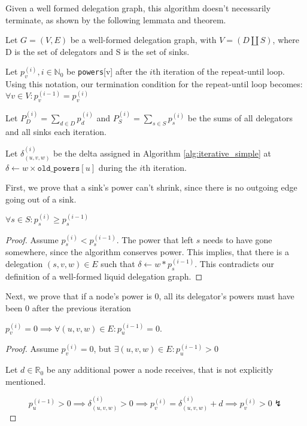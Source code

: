 
Given a well formed delegation graph, this algorithm doesn't necessarily terminate, as shown by the following lemmata and theorem.

Let $G = (V, E)$ be a well-formed delegation graph, with $V = (D \coprod S)$, where D is the set of delegators and S is the set of sinks.

Let $p_v^{(i)}, i \in \mathbb{N}_0$ be \texttt{powers}[v] after the $i$th iteration of the repeat-until loop. Using this notation, our termination condition for the repeat-until loop becomes: $\forall v \in V: p_v^{(i-1)} = p_v^{(i)}$

Let $P_D^{(i)} = \sum_{d \in D} p_d^{(i)}$ and $P_S^{(i)} = \sum_{s \in S} p_s^{(i)}$ be the sums of all delegators and all sinks each iteration.

Let $\delta_{(u, v, w)}^{(i)}$ be the delta assigned in Algorithm \ref{alg:iterative_simple} at $\delta \gets w \times \texttt{old\_powers}[u]$ during the $i$th iteration.

First, we prove that a sink's power can't shrink, since there is no outgoing edge going out of a sink.

\begin{lemma}\label{lem:sink_non_shrink}
$\forall s \in S: p_s^{(i)} \ge p_s^{(i-1)}$ 
\end{lemma}
\begin{proof}
Assume $p_s^{(i)} < p_s^{(i-1)}$. The power that left $s$ needs to have gone somewhere, since the algorithm conserves power. 
This implies, that there is a delegation $(s, v, w) \in E$ such that $\delta \gets w * p_s^{(i-1)}$. This contradicts our definition of a well-formed liquid delegation graph.
\end{proof}

Next, we prove that if a node's power is 0, all its delegator's powers must have been 0 after the previous iteration
\begin{lemma}\label{lem:simple_iterative_empty_node}
$p_v^{(i)} = 0 \implies \forall (u, v, w) \in E: p_u^{(i - 1)} = 0$. 
\end{lemma}
\begin{proof} Assume $p_v^{(i)} = 0$, but $\exists (u, v, w) \in E: p_u^{(i-1)} > 0$

Let $d \in \mathbb{R}_{0}$ be any additional power a node receives, that is not explicitly mentioned.

\[
p_u^{(i-1)} > 0 \implies \delta_{(u, v, w)}^{(i)} > 0 \implies p_v^{(i)} = \delta_{(u, v, w)}^{(i)} + d \implies p_v^{(i)} > 0 \lightning
\]

\end{proof}

